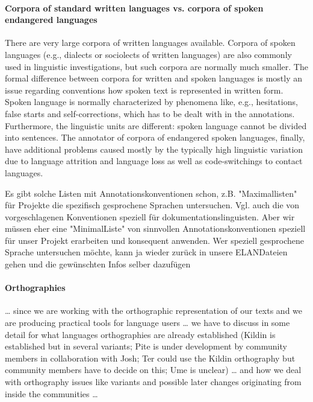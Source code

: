 \documentclass[a4paper,12pt]{article}
\begin{document}

\paragraph{Corpora of standard written languages vs. corpora of spoken endangered languages} 
There are very large corpora of written languages available. Corpora of spoken languages (e.g., dialects or sociolects of written languages) are also commonly used in linguistic investigations, but such corpora are normally much smaller. The formal difference between corpora for written and spoken languages is mostly an issue regarding conventions how spoken text is represented in written form. Spoken language is normally characterized by phenomena like, e.g., hesitations, false starts and self-corrections, which has to be dealt with in the annotations. Furthermore, the linguistic units are different: spoken language cannot be divided into sentences. The annotator of corpora of endangered spoken languages, finally, have additional problems caused mostly by the typically high linguistic variation due to language attrition and language loss as well as code-switchings to contact languages.

Es gibt solche Listen mit Annotationskonventionen schon, z.B. "Maximallisten" für Projekte die spezifisch gesprochene Sprachen untersuchen. Vgl. auch die von \citealt{schulze-bernd2006} vorgeschlagenen Konventionen speziell für dokumentationslinguisten. Aber wir müssen eher eine "MinimalListe" von sinnvollen Annotationskonventionen speziell für unser Projekt erarbeiten und konsequent anwenden. Wer speziell gesprochene Sprache untersuchen möchte, kann ja wieder zurück in unsere ELANDateien gehen und die gewünschten Infos selber dazufügen

\paragraph{Orthographies}
… since we are working with the orthographic representation of our texts and we are producing practical tools for language users … we have to discuss in some detail for what languages orthographies are already established (Kildin is established but in several variants; Pite is under development by community members in collaboration with Josh; Ter could use the Kildin orthography but community members have to decide on this; Ume is unclear) … and how we deal with orthography issues like variants and possible later changes originating from inside the communities … 
\end{document}
